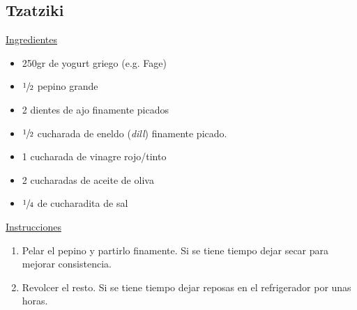 \subsection{Tzatziki}
\underline{Ingredientes}
\begin{itemize}
\item 250gr de yogurt griego (e.g. Fage)
\item $\sfrac{1}{2}$ pepino grande
\item 2 dientes de ajo finamente picados
\item $\sfrac{1}{2}$ cucharada de eneldo (\textit{dill}) finamente picado.
\item 1 cucharada de vinagre rojo/tinto
\item 2 cucharadas de aceite de oliva
\item $\sfrac{1}{4}$ de cucharadita de sal
\end{itemize}

\underline{Instrucciones}
\begin{enumerate}
\item Pelar el pepino y partirlo finamente. Si se tiene tiempo dejar secar para mejorar consistencia.
\item Revolcer el resto. Si se tiene tiempo dejar reposas en el refrigerador por unas horas.
\end{enumerate}
